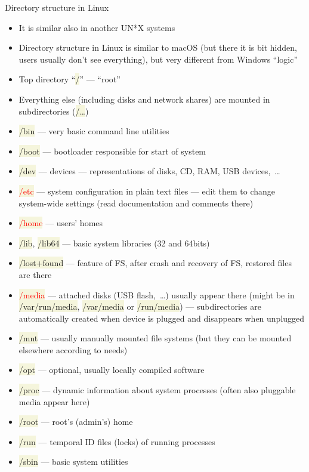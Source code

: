 \documentclass[compress, xelatex, 11pt, xcolor=svgnames, aspectratio=169, url={hyphens, lowtilde}]{beamer}
\renewcommand{\texttt}[1]{\colorbox{Beige}{{\ttfamily #1}}}
\renewcommand{\alert}[1]{\textcolor{red}{#1}}
\begin{document}
\begin{frame}[allowframebreaks]{Directory structure in Linux}
	\begin{itemize}
		\item It is similar also in another UN*X systems
		\item Directory structure in Linux is similar to macOS (but there it is bit hidden, users usually don't see everything), but very different from Windows \enquote{logic}
		\item Top directory \enquote{\texttt{/}} --- \enquote{root}
		\item Everything else (including disks and network shares) are mounted in subdirectories (\texttt{/\ldots})
		\item \texttt{/bin} --- very basic command line utilities
		\item \texttt{/boot} --- bootloader responsible for start of system
		\item \texttt{/dev} --- devices --- representations of disks, CD, RAM, USB devices,~\ldots
		\item \alert{\texttt{/etc}} --- system configuration in plain text files --- edit them to change system-wide settings (read documentation and comments there)
		\item \alert{\texttt{/home}} --- users' homes
		\item \texttt{/lib}, \texttt{/lib64} --- basic system libraries (32 and 64bits)
		\item \texttt{/lost+found} --- feature of FS, after crash and recovery of FS, restored files are there
		\item \alert{\texttt{/media}} --- attached disks (USB flash,~\ldots) usually appear there (might be in \texttt{/var/run/media}, \texttt{/var/media} or \texttt{/run/media}) --- subdirectories are automatically created when device is plugged and disappears when unplugged
		\item \texttt{/mnt} --- usually manually mounted file systems (but they can be mounted elsewhere according to needs)
		\item \texttt{/opt} --- optional, usually locally compiled software
		\item \texttt{/proc} --- dynamic information about system processes (often also pluggable media appear here)
		\item \texttt{/root} --- root's (admin's) home
		\item \texttt{/run} --- temporal ID files (locks) of running processes
		\item \texttt{/sbin} --- basic system utilities

\end{itemize}
\end{frame}
\end{document}
